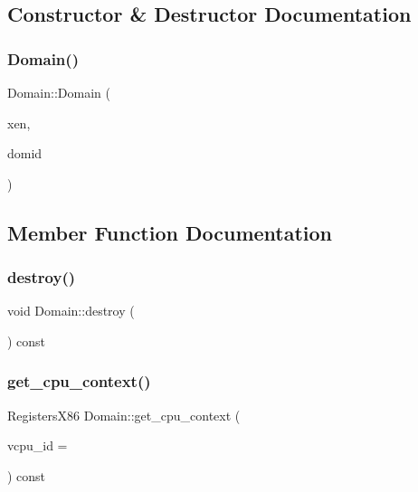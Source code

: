 \subsection{Constructor \& Destructor Documentation}
\mbox{\label{classxd_1_1xen_1_1_domain_a2ffecc895bc5a1b50794a137607e2990}} 
\subsubsection{\texorpdfstring{Domain()}{Domain()}}
{\footnotesize\ttfamily Domain\+::\+Domain (\begin{DoxyParamCaption}\item[{\mbox{\hyperlink{classxd_1_1xen_1_1_xen_handle}{Xen\+Handle}} \&}]{xen,  }\item[{\mbox{\hyperlink{namespacexd_1_1xen_aaad6b5eb6f7e5ba76a4e4ca166ac8a08}{Dom\+ID}}}]{domid }\end{DoxyParamCaption})}



\subsection{Member Function Documentation}
\mbox{\label{classxd_1_1xen_1_1_domain_aac7b9eafdc784bfa43c924cd6fa84d7e}} 
\subsubsection{\texorpdfstring{destroy()}{destroy()}}
{\footnotesize\ttfamily void Domain\+::destroy (\begin{DoxyParamCaption}{ }\end{DoxyParamCaption}) const}

\mbox{\label{classxd_1_1xen_1_1_domain_a84aa03ff405043dd90e5102a42274a2b}} 
\subsubsection{\texorpdfstring{get\+\_\+cpu\+\_\+context()}{get\_cpu\_context()}}
{\footnotesize\ttfamily Registers\+X86 Domain\+::get\+\_\+cpu\+\_\+context (\begin{DoxyParamCaption}\item[{\mbox{\hyperlink{namespacexd_1_1xen_ac71045dda8a7d9d6fd0d7643001bb14e}{V\+C\+P\+U\+\_\+\+ID}}}]{vcpu\+\_\+id = {} }\end{DoxyParamCaption}) const}

